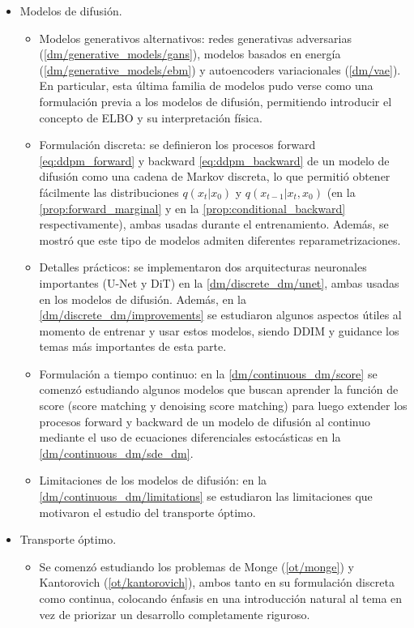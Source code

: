 \begin{itemize}
    \item Modelos de difusión.
    \begin{itemize}
        \item Modelos generativos alternativos: redes generativas adversarias (\autoref{dm/generative_models/gans}), modelos basados en energía (\autoref{dm/generative_models/ebm}) y autoencoders variacionales (\autoref{dm/vae}). En particular, esta última familia de modelos pudo verse como una formulación previa a los modelos de difusión, permitiendo introducir el concepto de ELBO y su interpretación física.
        \item Formulación discreta: se definieron los procesos forward \eqref{eq:ddpm_forward} y backward \eqref{eq:ddpm_backward} de un modelo de difusión como una cadena de Markov discreta, lo que permitió obtener fácilmente las distribuciones $q(x_t|x_0)$ y $q(x_{t-1}|x_t,x_0)$ (en la \autoref{prop:forward_marginal} y en la \autoref{prop:conditional_backward} respectivamente), ambas usadas durante el entrenamiento. Además, se mostró que este tipo de modelos admiten diferentes reparametrizaciones.
        \item Detalles prácticos: se implementaron dos arquitecturas neuronales importantes (U-Net y DiT) en la \autoref{dm/discrete_dm/unet}, ambas usadas en los modelos de difusión. Además, en la \autoref{dm/discrete_dm/improvements} se estudiaron algunos aspectos útiles al momento de entrenar y usar estos modelos, siendo DDIM y guidance los temas más importantes de esta parte.
        \item Formulación a tiempo continuo: en la \autoref{dm/continuous_dm/score} se comenzó estudiando algunos modelos que buscan aprender la función de score (score matching y denoising score matching) para luego extender los procesos forward y backward de un modelo de difusión al continuo mediante el uso de ecuaciones diferenciales estocásticas en la \autoref{dm/continuous_dm/sde_dm}.
        \item Limitaciones de los modelos de difusión: en la \autoref{dm/continuous_dm/limitations} se estudiaron las limitaciones que motivaron el estudio del transporte óptimo.
    \end{itemize}
    \item Transporte óptimo.
    \begin{itemize}
        \item Se comenzó estudiando los problemas de Monge (\autoref{ot/monge}) y Kantorovich (\autoref{ot/kantorovich}), ambos tanto en su formulación discreta como continua, colocando énfasis en una introducción natural al tema en vez de priorizar un desarrollo completamente riguroso.

\end{itemize}
\end{itemize}
